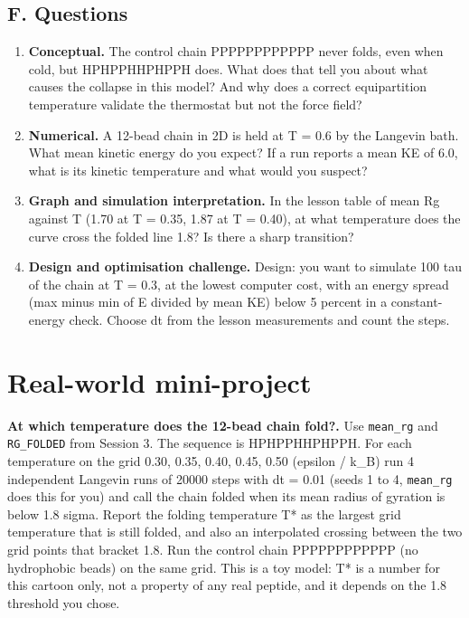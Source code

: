 \documentclass[11pt,a4paper]{article}
\begin{document}
\subsection*{F. Questions}
\begin{enumerate}[nosep]
\item \textbf{Conceptual.} The control chain PPPPPPPPPPPP never folds, even when cold, but HPHPPHHPHPPH does. What does that tell you about what causes the collapse in this model? And why does a correct equipartition temperature validate the thermostat but not the force field?
\item \textbf{Numerical.} A 12-bead chain in 2D is held at T = 0.6 by the Langevin bath. What mean kinetic energy do you expect? If a run reports a mean KE of 6.0, what is its kinetic temperature and what would you suspect?
\item \textbf{Graph and simulation interpretation.} In the lesson table of mean Rg against T (1.70 at T = 0.35, 1.87 at T = 0.40), at what temperature does the curve cross the folded line 1.8? Is there a sharp transition?
\item \textbf{Design and optimisation challenge.} Design: you want to simulate 100 tau of the chain at T = 0.3, at the lowest computer cost, with an energy spread (max minus min of E divided by mean KE) below 5 percent in a constant-energy check. Choose dt from the lesson measurements and count the steps.
\end{enumerate}

\section{Real-world mini-project}
\textbf{At which temperature does the 12-bead chain fold?.} Use \texttt{mean\_rg} and \texttt{RG\_FOLDED} from Session 3. The sequence is HPHPPHHPHPPH. For each temperature on the grid 0.30, 0.35, 0.40, 0.45, 0.50 (epsilon / k\_B) run 4 independent Langevin runs of 20000 steps with dt = 0.01 (seeds 1 to 4, \texttt{mean\_rg} does this for you) and call the chain folded when its mean radius of gyration is below 1.8 sigma. Report the folding temperature T* as the largest grid temperature that is still folded, and also an interpolated crossing between the two grid points that bracket 1.8. Run the control chain PPPPPPPPPPPP (no hydrophobic beads) on the same grid. This is a toy model: T* is a number for this cartoon only, not a property of any real peptide, and it depends on the 1.8 threshold you chose.
\end{document}
